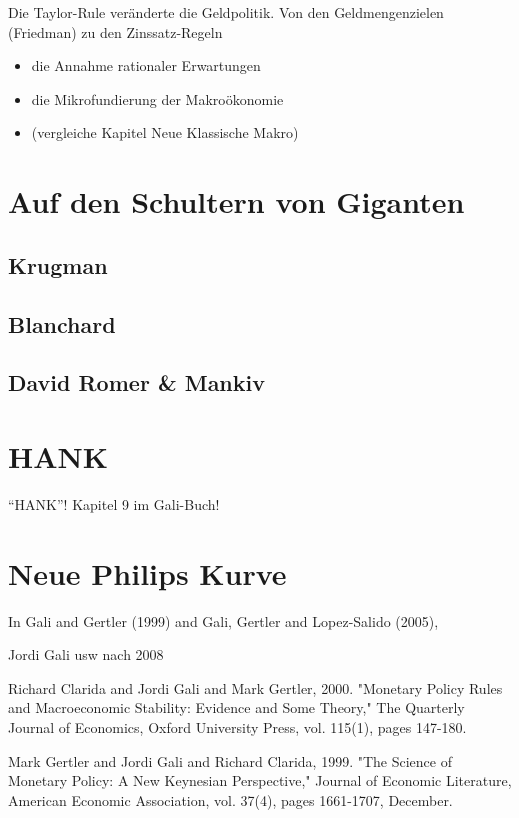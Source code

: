 Die Taylor-Rule veränderte die Geldpolitik. Von den Geldmengenzielen (Friedman) zu den Zinssatz-Regeln \parencite[S. 36]{Gali2007}





\begin{itemize}
	\item die Annahme rationaler Erwartungen
	\item die Mikrofundierung der Makroökonomie
	\item (vergleiche Kapitel Neue Klassische Makro)
\end{itemize}






\section{Auf den Schultern von Giganten}
\label{Giganten}

\subsection{Krugman}

\subsection{Blanchard}

\subsection{David Romer \& Mankiv}



\section{HANK}
"`HANK"'!
Kapitel 9 im Gali-Buch!

\section{Neue Philips Kurve}

In Gali and Gertler (1999) and Gali, Gertler and Lopez-Salido (2005),


Jordi Gali usw nach 2008




Richard Clarida and Jordi Gali and Mark Gertler, 2000. "Monetary Policy Rules and Macroeconomic Stability: Evidence and Some Theory," The Quarterly Journal of Economics, Oxford University Press, vol. 115(1), pages 147-180.

Mark Gertler and Jordi Gali and Richard Clarida, 1999. "The Science of Monetary Policy: A New Keynesian Perspective," Journal of Economic Literature, American Economic Association, vol. 37(4), pages 1661-1707, December.
